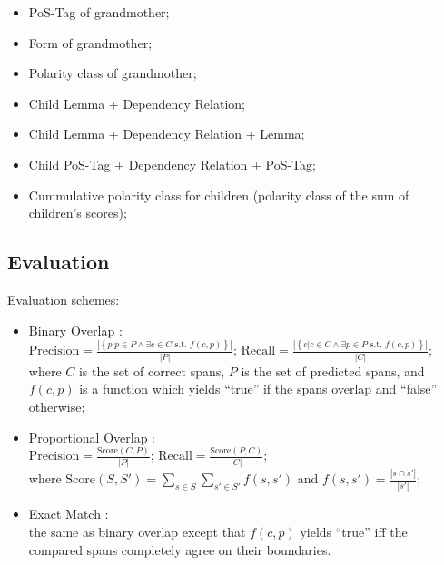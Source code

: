 \documentclass{beamer}
\begin{document}
\begin{frame}{\insertsubsection}
\begin{multicols}{2}
\begin{itemize}
\begin{itemize}
            \item PoS-Tag of grandmother;
            \item Form of grandmother;
            \item Polarity class of grandmother;
            \item Child Lemma + Dependency Relation;
            \item Child Lemma + Dependency Relation + Lemma;
            \item Child PoS-Tag + Dependency Relation + PoS-Tag;
            \item Cummulative polarity class for children (polarity
              class of the sum of children's scores);
          \end{itemize}
        \end{itemize}
      \end{multicols}
    \end{frame}

    \subsection{Evaluation}
    \begin{frame}{\insertsubsection}
      Evaluation schemes:
      \begin{itemize}
        \scriptsize
        \item<1-> Binary Overlap \cite{Breck-07}:\\
          \begin{math}\textstyle
            \text{Precision} = \frac{|\left\{p| p \in P \wedge \exists
              c \in C \text{ s.t. } f(c,p)\right\}|}{|P|}\text{; }
            \text{Recall} = \frac{|\left\{c| c \in C \wedge \exists p
              \in P \text{ s.t. } f(c,p)\right\}|}{|C|};
          \end{math}\\
          where $C$ is the set of correct spans, $P$ is the set of
          predicted spans, and $f(c, p)$ is a function which yields
          ``true'' if the spans overlap and ``false'' otherwise;
        \item<2-> Proportional Overlap \cite{Johansson-10}:\\
          \begin{math}\textstyle
            \text{Precision} = \frac{\text{Score}(C, P)}{|P|}\text{;
            }\text{Recall} = \frac{\text{Score}(P, C)}{|C|};
          \end{math}\\
          where $\text{Score}(S, S') = \sum_{s \in S}\sum_{s' \in
            S'}f(s, s')$ and $f(s, s') = \frac{|s \cap s'|}{|s'|}$;
        \item<3-> Exact Match \cite{Breck-07}:\\ the same as
          binary overlap except that $f(c, p)$ yields ``true'' iff the
          compared spans completely agree on their boundaries.
      \end{itemize}
    \end{frame}
\end{document}
